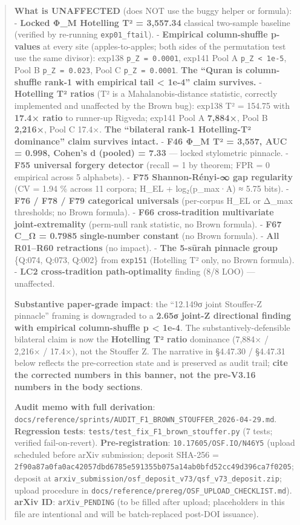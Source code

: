\documentclass[
]{article}
\begin{document}
\begin{quote}
\textbf{What is UNAFFECTED} (does NOT use the buggy helper or formula):
- \textbf{Locked Φ\_M Hotelling T² = 3,557.34} classical two-sample
baseline (verified by re-running \texttt{exp01\_ftail}). -
\textbf{Empirical column-shuffle p-values} at every site
(apples-to-apples; both sides of the permutation test use the same
divisor): exp138 \texttt{p\_Z\ =\ 0.0001}, exp141 Pool A
\texttt{p\_Z\ \textless{}\ 1e-5}, Pool B \texttt{p\_Z\ =\ 0.023}, Pool C
\texttt{p\_Z\ =\ 0.0001}. \textbf{The ``Quran is column-shuffle rank-1
with empirical tail \textless{} 1e-4'' claim survives.} -
\textbf{Hotelling T² ratios} (T² is a Mahalanobis-distance statistic,
correctly implemented and unaffected by the Brown bug): exp138 T² =
154.75 with \textbf{17.4× ratio} to runner-up Rigveda; exp141 Pool A
\textbf{7,884×}, Pool B \textbf{2,216×}, Pool C 17.4×. \textbf{The
``bilateral rank-1 Hotelling-T² dominance'' claim survives intact.} -
\textbf{F46 Φ\_M T² = 3,557, AUC = 0.998, Cohen's d (pooled) = 7.33} ---
locked stylometric pinnacle. - \textbf{F55 universal forgery detector}
(recall = 1 by theorem; FPR = 0 empirical across 5 alphabets). -
\textbf{F75 Shannon-Rényi-∞ gap regularity} (CV = 1.94 \% across 11
corpora; H\_EL + log₂(p\_max·A) ≈ 5.75 bits). - \textbf{F76 / F78 / F79
categorical universals} (per-corpus H\_EL or Δ\_max thresholds; no Brown
formula). - \textbf{F66 cross-tradition multivariate joint-extremality}
(perm-null rank statistic, no Brown formula). - \textbf{F67 C\_Ω =
0.7985 single-number constant} (no Brown formula). - \textbf{All
R01--R60 retractions} (no impact). - \textbf{The 5-sūrah pinnacle group}
\{Q:074, Q:073, Q:002\} from \texttt{exp151} (Hotelling T² only, no
Brown formula). - \textbf{LC2 cross-tradition path-optimality} finding
(8/8 LOO) --- unaffected.

\textbf{Substantive paper-grade impact}: the ``12.149σ joint Stouffer-Z
pinnacle'' framing is downgraded to a \textbf{2.65σ joint-Z directional
finding with empirical column-shuffle p \textless{} 1e-4}. The
substantively-defensible bilateral claim is now the \textbf{Hotelling T²
ratio} dominance (7,884× / 2,216× / 17.4×), not the Stouffer Z. The
narrative in §4.47.30 / §4.47.31 below reflects the pre-correction state
and is preserved as audit trail; \textbf{cite the corrected numbers in
this banner, not the pre-V3.16 numbers in the body sections}.

\textbf{Audit memo with full derivation}:
\texttt{docs/reference/sprints/AUDIT\_F1\_BROWN\_STOUFFER\_2026-04-29.md}.
\textbf{Regression tests}:
\texttt{tests/test\_fix\_F1\_brown\_stouffer.py} (7 tests; verified
fail-on-revert). \textbf{Pre-registration}:
\texttt{10.17605/OSF.IO/N46Y5} (upload scheduled before arXiv
submission; deposit SHA-256 =
\texttt{2f90a87a0fa0ac42057dbd6785e591355b075a14ab0bfd52cc49d396ca7f0205};
deposit at
\texttt{arxiv\_submission/osf\_deposit\_v73/qsf\_v73\_deposit.zip};
upload procedure in
\texttt{docs/reference/prereg/OSF\_UPLOAD\_CHECKLIST.md}). \textbf{arXiv
ID}: \texttt{arXiv\_PENDING} (to be filled after upload; placeholders in
this file are intentional and will be batch-replaced post-DOI issuance).
\end{quote}
\end{document}
